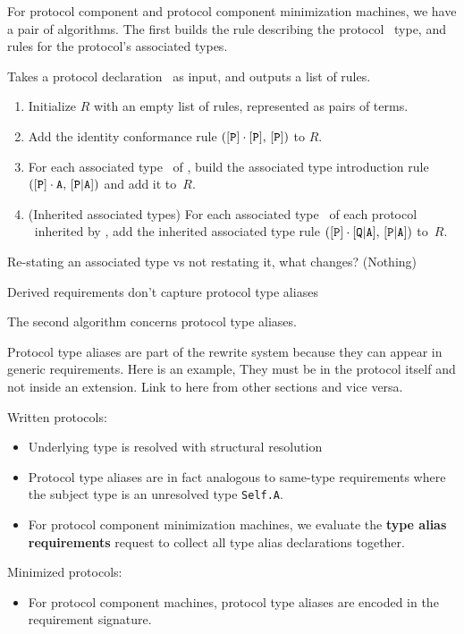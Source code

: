 \documentclass[../generics]{subfiles}
\begin{document}
For protocol component and protocol component minimization machines, we have a pair of algorithms. The first builds the rule describing the protocol \tSelf\ type, and rules for the protocol's associated types.
\begin{algorithm}\label{rules for protocol algo}
Takes a protocol declaration \tP\ as input, and outputs a list of rules.
\begin{enumerate}
\item Initialize $R$ with an empty list of rules, represented as pairs of terms.
\item Add the identity conformance rule $([\texttt{P}] \cdot [\texttt{P}],\, [\texttt{P}])$ to $R$.
\item For each associated type \nA\ of \tP, build the associated type introduction rule $([\texttt{P}] \cdot \texttt{A},\, [\texttt{P}|\texttt{A}])$ and add it to~$R$.

\item (Inherited associated types) For each associated type \nA\ of each protocol \tQ\ inherited by \tP, add the inherited associated type rule $([\texttt{P}] \cdot [\texttt{Q}|\texttt{A}],\,[\texttt{P}|\texttt{A}])$ to~$R$.
\end{enumerate}
\end{algorithm}

Re-stating an associated type vs not restating it, what changes? (Nothing)

Derived requirements don’t capture protocol type aliases

The second algorithm concerns protocol type aliases. 

Protocol type aliases are part of the rewrite system because they can appear in generic requirements. Here is an example, They must be in the protocol itself and not inside an extension. Link to here from other sections and vice versa.

Written protocols:
\begin{itemize}
\item Underlying type is resolved with structural resolution
\item Protocol type aliases are in fact analogous to same-type requirements where the subject type is an unresolved type \texttt{Self.A}.
\item For protocol component minimization machines, we evaluate the \textbf{type alias requirements} request to collect all type alias declarations together.
\end{itemize}

Minimized protocols:
\begin{itemize}
\item For protocol component machines, protocol type aliases are encoded in the requirement signature. 
\end{itemize}
\end{document}
